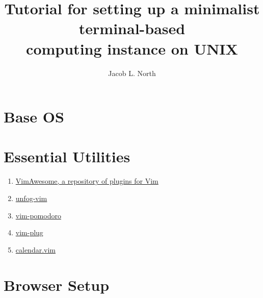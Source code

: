 \documentclass[]{article}
\title{Tutorial for setting up a minimalist terminal-based\\computing instance on UNIX}
\author{Jacob L. North}
\begin{document}
\maketitle

\vfill

\tableofcontents

\vfill

\section{Base OS}

\section{Essential Utilities}
\begin{enumerate}
    \item \href{https://vimawesome.com/}{VimAwesome, a repository of plugins for Vim}
    \item \href{https://github.com/unfog-io/unfog-vim}{unfog-vim}
    \item \href{https://github.com/mnick/vim-pomodoro}{vim-pomodoro}
    \item \href{https://github.com/junegunn/vim-plug}{vim-plug}
    \item \href{https://github.com/itchyny/calendar.vim}{calendar.vim}
\end{enumerate}

\section{Browser Setup}

\section{}
\end{document}
